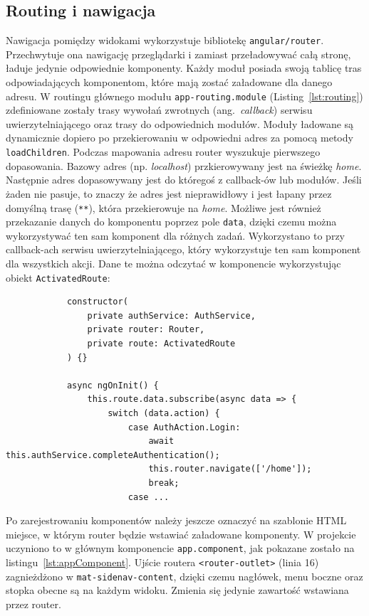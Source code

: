 	\subsection{Routing i nawigacja}
		Nawigacja pomiędzy widokami wykorzystuje bibliotekę \verb|angular/router|.
		Przechwytuje ona nawigację przeglądarki i zamiast przeładowywać całą stronę, ładuje jedynie odpowiednie komponenty.
		Każdy moduł posiada swoją tablicę tras odpowiadających komponentom, które mają zostać załadowane dla danego adresu.
		W routingu głównego modułu \verb|app-routing.module| (Listing~\ref{lst:routing})
		zdefiniowane zostały trasy wywołań zwrotnych (ang.\ \emph{callback}) serwisu uwierzytelniającego oraz trasy do odpowiednich modułów.
		Moduły ładowane są dynamicznie dopiero po przekierowaniu w odpowiedni adres za pomocą metody \verb|loadChildren|.
		Podczas mapowania adresu router wyszukuje pierwszego dopasowania.
		Bazowy adres (np. \emph{localhost}) przkierowywany jest na świeżkę \emph{home}.
		Następnie adres dopasowywany jest do któregoś z callback-ów lub modułów.
		Jeśli żaden nie pasuje, to znaczy że adres jest nieprawidłowy i jest łapany przez domyślną trasę (\verb|**|), która przekierowuje na \emph{home}.
		Możliwe jest również przekazanie danych do komponentu poprzez pole \verb|data|, dzięki czemu można wykorzystywać ten sam komponent dla różnych zadań.
		Wykorzystano to przy callback-ach serwisu uwierzytelniającego, który wykorzystuje ten sam komponent dla wszystkich akcji.
		Dane te można odczytać w komponencie wykorzystując obiekt \verb|ActivatedRoute|:
		\begin{lstlisting}
			constructor(
				private authService: AuthService,
				private router: Router,
				private route: ActivatedRoute
			) {}
		
			async ngOnInit() {
				this.route.data.subscribe(async data => {
					switch (data.action) {
						case AuthAction.Login:
							await this.authService.completeAuthentication();
							this.router.navigate(['/home']);
							break;
						case ...
		\end{lstlisting}

		Po zarejestrowaniu komponentów należy jeszcze oznaczyć na szablonie HTML miejsce, w którym router będzie wstawiać załadowane komponenty.
		W projekcie uczyniono to w głównym komponencie \verb|app.component|, jak pokazane zostało na listingu~\ref{lst:appComponent}.
		Ujście routera \verb|<router-outlet>| (linia 16) zagnieżdżono w \verb|mat-sidenav-content|,
		dzięki czemu nagłówek, menu boczne oraz stopka obecne są na każdym widoku.
		Zmienia się jedynie zawartość wstawiana przez router.

